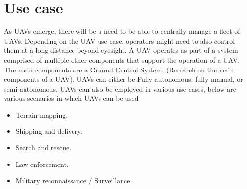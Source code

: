 \section{Use case}
\label{sec:use-case}

As UAVs emerge, there will be a need to be able to centrally manage a fleet of UAVs. Depending on the UAV use case, operators might need to also control them at a long distance beyond eyesight. A UAV operates as part of a system comprised of multiple other components that support the operation of a UAV. The main components are a Ground Control System, (Research on the main components of a UAV). UAVs can either be Fully autonomous, fully manual, or semi-autonomous. UAVs can also be employed in various use cases, below are various scenarios in which UAVs can be used
\begin{itemize}
    \item Terrain mapping.
    \item Shipping and delivery.
    \item Search and rescue.
    \item Law enforcement.
    \item Military reconnaissance / Surveillance.
\end{itemize}

